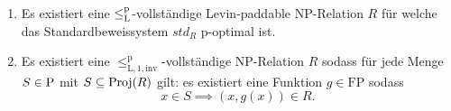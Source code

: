 \begin{theorem}
\begin{enumerate}
        \item Es existiert eine $\leqlp$-vollständige Levin-paddable NP-Relation $R$ für welche das Standardbeweissystem $\mathit{std}_R$ p-optimal ist.
        \item Es existiert eine $\leq_\mathrm{L,1,inv}^\mathrm p$-vollständige NP-Relation $R$ sodass für jede Menge $S\in \P$ mit $S\subseteq \Proj(R)$ gilt: es existiert eine Funktion $g\in\mathrm{FP}$ sodass
            \[ x\in S \implies (x, g(x))\in R. \]
    \end{enumerate}
\end{theorem}
